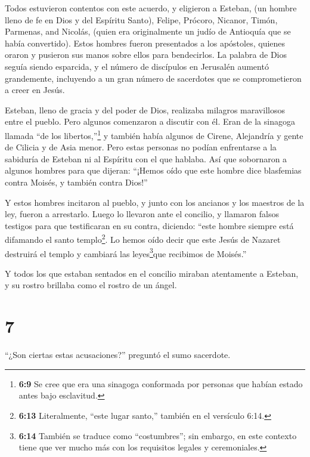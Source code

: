  Todos estuvieron contentos con este acuerdo, y eligieron a
Esteban, (un hombre lleno de fe en Dios y del Espíritu Santo), Felipe,
Prócoro, Nicanor, Timón, Parmenas, and Nicolás, (quien era originalmente
un judío de Antioquía que se había convertido).  Estos
hombres fueron presentados a los apóstoles, quienes oraron y pusieron
sus manos sobre ellos para bendecirlos.  La palabra de Dios
seguía siendo esparcida, y el número de discípulos en Jerusalén aumentó
grandemente, incluyendo a un gran número de sacerdotes que se
comprometieron a creer en Jesús.

 Esteban, lleno de gracia y del poder de Dios, realizaba
milagros maravillosos entre el pueblo.  Pero algunos
comenzaron a discutir con él. Eran de la sinagoga llamada ``de los
libertos,''\footnote{\textbf{6:9} Se cree que era una sinagoga
  conformada por personas que habían estado antes bajo esclavitud.} y
también había algunos de Cirene, Alejandría y gente de Cilicia y de Asia
menor.  Pero estas personas no podían enfrentarse a la
sabiduría de Esteban ni al Espíritu con el que hablaba. 
Así que sobornaron a algunos hombres para que dijeran: ``¡Hemos oído que
este hombre dice blasfemias contra Moisés, y también contra Dios!''

 Y estos hombres incitaron al pueblo, y junto con los
ancianos y los maestros de la ley, fueron a arrestarlo. Luego lo
llevaron ante el concilio,  y llamaron falsos testigos para
que testificaran en su contra, diciendo: ``este hombre siempre está
difamando el santo templo\footnote{\textbf{6:13} Literalmente, ``este
  lugar santo,'' también en el versículo 6:14.}.  Lo hemos
oído decir que este Jesús de Nazaret destruirá el templo y cambiará las
leyes\footnote{\textbf{6:14} También se traduce como ``costumbres''; sin
  embargo, en este contexto tiene que ver mucho más con los requisitos
  legales y ceremoniales.}que recibimos de Moisés.''

 Y todos los que estaban sentados en el concilio miraban
atentamente a Esteban, y su rostro brillaba como el rostro de un ángel.

\hypertarget{section-6}{%
\section{7}\label{section-6}}

 ``¿Son ciertas estas acusaciones?'' preguntó el sumo
sacerdote.

